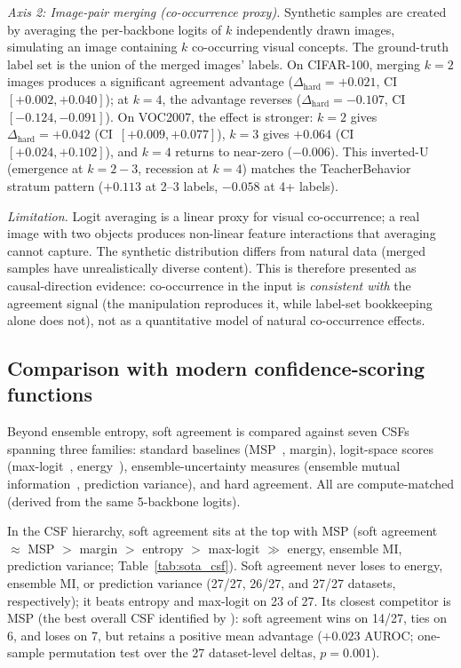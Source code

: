 \documentclass[a4paper,fleqn]{cas-sc}
\begin{document}
\textit{Axis 2: Image-pair merging (co-occurrence proxy).}
Synthetic samples are created by averaging the per-backbone logits of $k$ independently drawn images, simulating an image containing $k$ co-occurring visual concepts.
The ground-truth label set is the union of the merged images' labels.
On CIFAR-100, merging $k{=}2$ images produces a significant agreement advantage ($\Delta_{\text{hard}} = +0.021$, CI~$[+0.002, +0.040]$); at $k{=}4$, the advantage reverses ($\Delta_{\text{hard}} = -0.107$, CI~$[-0.124, -0.091]$).
On VOC2007, the effect is stronger: $k{=}2$ gives $\Delta_{\text{hard}} = +0.042$ (CI~$[+0.009, +0.077]$), $k{=}3$ gives $+0.064$ (CI~$[+0.024, +0.102]$), and $k{=}4$ returns to near-zero ($-0.006$).
This inverted-U (emergence at $k{=}2{-}3$, recession at $k{=}4$) matches the TeacherBehavior stratum pattern ($+0.113$ at 2--3 labels, $-0.058$ at 4+ labels).

\textit{Limitation.}
Logit averaging is a linear proxy for visual co-occurrence; a real image with two objects produces non-linear feature interactions that averaging cannot capture.
The synthetic distribution differs from natural data (merged samples have unrealistically diverse content).
This is therefore presented as causal-direction evidence: co-occurrence in the input is \emph{consistent with} the agreement signal (the manipulation reproduces it, while label-set bookkeeping alone does not), not as a quantitative model of natural co-occurrence effects.


\subsection{Comparison with modern confidence-scoring functions}
\label{sec:sota_csf}
Beyond ensemble entropy, soft agreement is compared against seven CSFs spanning three families: standard baselines (MSP~\citep{hendrycks2017baseline}, margin), logit-space scores (max-logit~\citep{hendrycks2022scaling}, energy~\citep{liu2020energy}), ensemble-uncertainty measures (ensemble mutual information~\citep{smith2018understanding}, prediction variance), and hard agreement.
All are compute-matched (derived from the same 5-backbone logits).

In the CSF hierarchy, soft agreement sits at the top with MSP (soft agreement $\approx$ MSP $>$ margin $>$ entropy $>$ max-logit $\gg$ energy, ensemble MI, prediction variance; Table~\ref{tab:sota_csf}).
Soft agreement never loses to energy, ensemble MI, or prediction variance (27/27, 26/27, and 27/27 datasets, respectively); it beats entropy and max-logit on 23 of 27.
Its closest competitor is MSP (the best overall CSF identified by \citet{jaeger2023call}): soft agreement wins on 14/27, ties on 6, and loses on 7, but retains a positive mean advantage ($+0.023$ AUROC; one-sample permutation test over the 27 dataset-level deltas, $p=0.001$).
\end{document}

